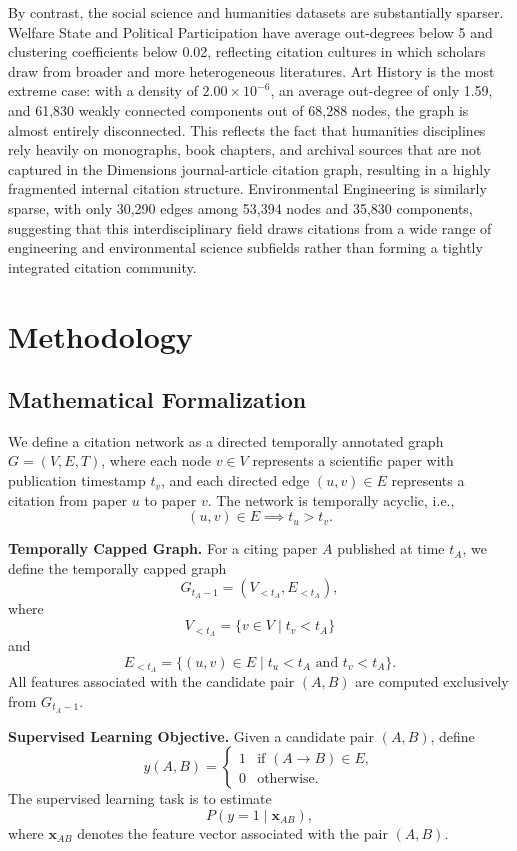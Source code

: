 \documentclass[11pt,a4paper]{article}
\begin{document}
By contrast, the social science and humanities datasets are substantially sparser. Welfare State and Political Participation have average out-degrees below 5 and clustering coefficients below 0.02, reflecting citation cultures in which scholars draw from broader and more heterogeneous literatures. Art History is the most extreme case: with a density of $2.00\times 10^{-6}$, an average out-degree of only 1.59, and 61,830 weakly connected components out of 68,288 nodes, the graph is almost entirely disconnected. This reflects the fact that humanities disciplines rely heavily on monographs, book chapters, and archival sources that are not captured in the Dimensions journal-article citation graph, resulting in a highly fragmented internal citation structure. Environmental Engineering is similarly sparse, with only 30,290 edges among 53,394 nodes and 35,830 components, suggesting that this interdisciplinary field draws citations from a wide range of engineering and environmental science subfields rather than forming a tightly integrated citation community.

\section{Methodology}
\label{sec:method}

\subsection{Mathematical Formalization}

We define a citation network as a directed temporally annotated graph \(G = (V,E,T)\), where each node \(v \in V\) represents a scientific paper with publication timestamp \(t_v\), and each directed edge \((u,v) \in E\) represents a citation from paper \(u\) to paper \(v\). The network is temporally acyclic, i.e.,
\[
(u,v) \in E \implies t_u > t_v.
\]

\textbf{Temporally Capped Graph.}
For a citing paper \(A\) published at time \(t_A\), we define the temporally capped graph
\[
G_{t_A-1} = (V_{<t_A}, E_{<t_A}),
\]
where
\[
V_{<t_A} = \{v \in V \mid t_v < t_A\}
\]
and
\[
E_{<t_A} = \{(u,v) \in E \mid t_u < t_A \text{ and } t_v < t_A\}.
\]
All features associated with the candidate pair \((A,B)\) are computed exclusively from \(G_{t_A-1}\).

\textbf{Supervised Learning Objective.}
Given a candidate pair \((A,B)\), define
\[
y(A,B)=
\begin{cases}
1 & \text{if } (A \to B)\in E,\\
0 & \text{otherwise}.
\end{cases}
\]
The supervised learning task is to estimate
\[
P\!\left(y=1 \mid \mathbf{x}_{AB}\right),
\]
where \(\mathbf{x}_{AB}\) denotes the feature vector associated with the pair \((A,B)\).
\end{document}
